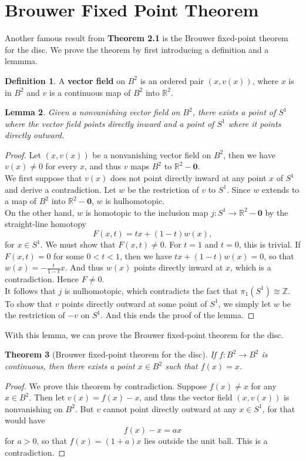 \documentclass[psamsfonts]{amsart}
\newtheorem{thm}{Theorem}[section]
\newtheorem{lem}[thm]{Lemma}
\theoremstyle{definition}
\newtheorem{defn}[thm]{Definition}
\theoremstyle{remark}
\numberwithin{equation}{section}
\begin{document}
\section{Brouwer Fixed Point Theorem}
	Another famous result from \textbf{Theorem 2.1} is the Brouwer fixed-point theorem for the disc. We prove the theorem by first introducing a definition and a lemmma.
	\begin{defn}
		A \textbf{vector field} on $B^2$ is an ordered pair $(x,v(x))$, where $x$ is in $B^2$ and $v$ is a continuous map of $B^2$ into $\mathbb{R}^2$.
	\end{defn}
	\begin{lem}
		Given a nonvanishing vector field on $B^2$, there exists a point of $S^1$ where the vector field points directly inward and a point of $S^1$ where it points directly outward.
	\end{lem}
	\begin{proof}
		Let $(x,v(x))$ be a nonvanishing vector field on $B^2$, then we have $v(x) \neq 0$ for every $x$, and thus $v$ maps $B^2$ to $\mathbb{R}^2-\textbf{0}$.\\
		We first suppose that $v(x)$ does not point directly inward at any point $x$ of $S^1$ and derive a contradiction. Let $w$ be the restriction of $v$ to $S^1$. Since $w$ extends to a map of $B^2$ into $\mathbb{R}^2-\textbf{0}$, $w$ is hulhomotopic.\\
		On the other hand, $w$ is homotopic to the inclusion map $j: S^1 \to \mathbb{R}^2-\textbf{0}$ by the straight-line homotopy
		\begin{equation}
			F(x,t) = tx + (1-t)w(x),
		\end{equation}
		for $x \in S^1$. We must show that $F(x,t)\neq 0$. For $t=1$ and $t=0$, this is trivial. If $F(x,t)=0$ for some $0<t<1$, then we have $tx+(1-t)w(x)=0$, so that $w(x) = -\frac{t}{1-t}x$. And thus $w(x)$ points directly inward at $x$, which is a contradiction. Hence $F \neq 0$.\\
		It follows that $j$ is nulhomotopic, which contradicts the fact that $\pi_1(S^1) \cong \mathbb{Z}$.\\
		To show that $v$ points directly outward at some point of $S^1$, we simply let $w$ be the restriction of $-v$ on $S^1$. And this ends the proof of the lemma. 
	\end{proof}
	With this lemma, we can prove the Brouwer fixed-point theorem for the disc.
	\begin{thm}[Brouwer fixed-point theorem for the disc]
		If $f:B^2 \to B^2$ is continuous, then there exists a point $x \in B^2$ such that $f(x)=x$.
	\end{thm}
	\begin{proof}
		We prove this theorem by contradiction. Suppose $f(x) \neq x$ for any $x \in B^2$. Then let $v(x) = f(x) -x$, and thus the vector field $(x,v(x))$ is nonvanishing on $B^2$. But $v$ cannot point directly outward at any $x \in S^1$, for that would have
		\begin{equation}
			f(x) - x = ax
 		\end{equation}
 		for $a>0$, so that $f(x) = (1+a)x$ lies outside the unit ball. This is a contradiction.		  
	\end{proof}
	
\end{document}
